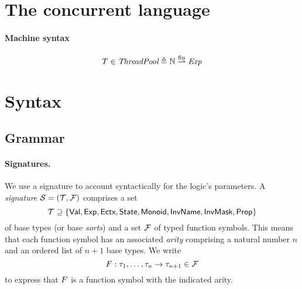 \section{The concurrent language}

\paragraph{Machine syntax}
\[
	T \in \textit{ThreadPool} \triangleq \mathbb{N} \stackrel{\textrm{fin}}{\rightharpoonup} \textit{Exp}
\]

 {\cfg{\state}{\tpool} \step
  }

\section{Syntax}

\subsection{Grammar}\label{sec:grammar}

\paragraph{Signatures.}
We use a signature to account syntactically for the logic's parameters.
A \emph{signature} $\mathcal{S} = (\mathcal{T}, \mathcal{F})$ comprises a set
\[
	\mathcal{T} \supseteq \{ \textsf{Val}, \textsf{Exp}, \textsf{Ectx}, \textsf{State}, \textsf{Monoid}, \textsf{InvName}, \textsf{InvMask}, \textsf{Prop} \}
\]
of base types (or base \emph{sorts}) and a set $\mathcal{F}$ of typed function symbols.
This means that each function symbol has an associated \emph{arity} comprising a natural number $n$ and an ordered list of $n+1$ base types.
We write
\[
	F : \tau_1, \dots, \tau_n \to \tau_{n+1} \in \mathcal{F}
\]
to express that $F$ is a function symbol with the indicated arity.

